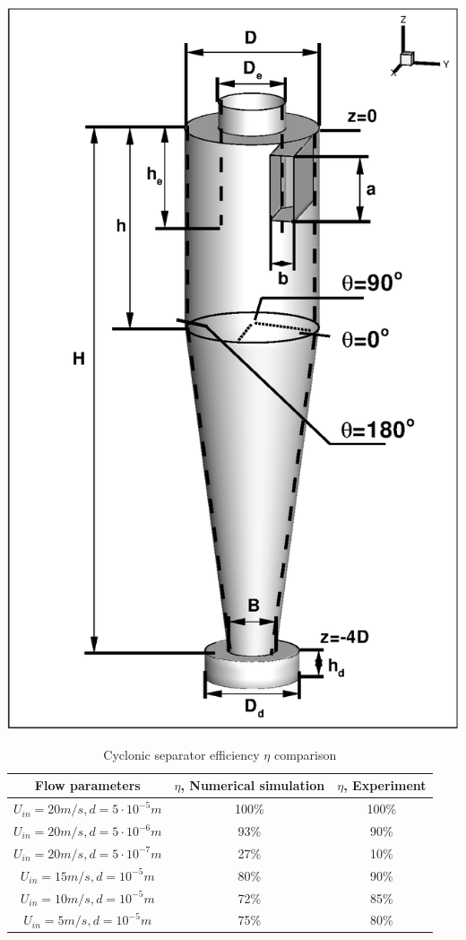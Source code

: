 \documentclass[a4paper]{jpconf}
\begin{document}
  \begin{minipage}{0.35\textwidth}
    \includegraphics[scale=0.43]{cycloneGeometryTeta}
	\label{fig:cycloneGeometryScheme}
  \end{minipage}
\begin{table}[h]
\begin{center}
		\caption{Cyclonic separator efficiency $\eta$ comparison}
		\label{tableSolution}
		\begin{tabular}{|c|c|c|}
			\hline
			Flow parameters & $\eta$, Numerical simulation & $\eta$, Experiment\\
			\hline
			$U_{in}=20m/s, d=5 \cdot 10^{-5}m$ & 100\% & 100\% \\
			\hline
			$U_{in}=20m/s, d=5 \cdot 10^{-6}m$ & 93\% & 90\%\\
			\hline
			$U_{in}=20m/s, d=5 \cdot 10^{-7}m$ & 27\% & 10\%\\
			\hline
			$U_{in}=15m/s, d=10^{-5}m$ & 80\% & 90\% \\
			\hline
			$U_{in}=10m/s, d=10^{-5}m$ & 72\% & 85\% \\
			\hline
			$U_{in}=5m/s, d=10^{-5}m$ & 75\% & 80\% \\
			\hline
		\end{tabular}
\end{center}
	\end{table}
\end{document}

